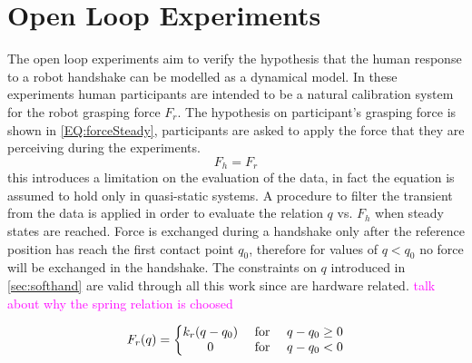 \chapter{Open Loop Experiments}
The open loop experiments aim to verify the hypothesis that the human response to a robot handshake can be modelled as a dynamical model. In these experiments human participants are intended to be a natural calibration system for the robot grasping force $F_r$. The hypothesis on participant's grasping force is shown in \ref{EQ:forceSteady}, participants are asked to apply the force that they are perceiving during the experiments.\\
\begin{equation}
F_{h} = F_{r}
\label{EQ:forceSteady}
\end{equation}
this introduces a limitation on the evaluation of the data, in fact the equation is assumed to hold only in quasi-static systems. A procedure to filter the transient from the data is applied in order to evaluate the relation $q$ vs. $F_h$ when steady states are reached.
Force is exchanged during a handshake only after the reference position has reach the first contact point $q_0$, therefore for values of $q < q_0$ no force will be exchanged in the handshake. The constraints on $q$ introduced in \ref{sec:softhand} are valid through all this work since are hardware related.
\textcolor{magenta}{talk about why the spring relation is choosed}

\begin{equation}
F_{r}(q)=\left\{\begin{matrix}
k_{r}(q-q_0) & $ for $ &q-q_0 \geq 0 \\ 
0 & $ for $ & q-q_0 < 0
\end{matrix}\right.
\label{EQ:genericForce}
\end{equation}

%

